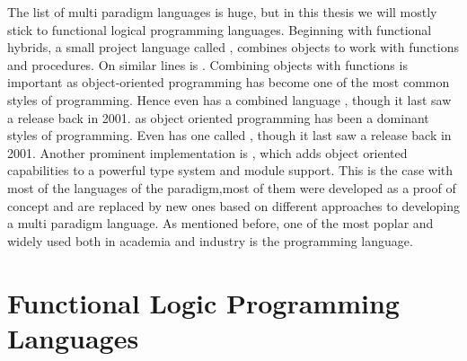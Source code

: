 \documentclass[thesis-solanki.tex]{subfiles}
\begin{document}
The list of multi paradigm languages is huge, but in this thesis we will mostly stick to functional logical
programming languages. Beginning with functional hybrids, a small project language called 
\cite{website:virgil}, combines objects to work with functions and procedures.
On similar lines is  \cite{website:closwiki}.
Combining objects with functions is important as object-oriented programming has become one of the most common styles of programming. Hence 
even  has a combined language , though it last saw a 
release back in 2001.
as object oriented programming has been a dominant styles of programming. Even  has one called 
\cite{website:ohaskell},
though it last saw a release back in 2001.
Another prominent implementation is 
\cite{website:ocamlwiki,website:ocamllang},
which adds object oriented capabilities to a powerful type system and module support.
This is the case with most of the languages of the paradigm,most of them were developed as a proof of concept and are replaced by 
new ones based on different approaches to developing a multi paradigm language.
As mentioned before, one of the most poplar \cite{website:langpop} and widely used both in academia and industry is
the  \cite{website:scala} programming language.


\section{Functional Logic Programming Languages}
\end{document}
